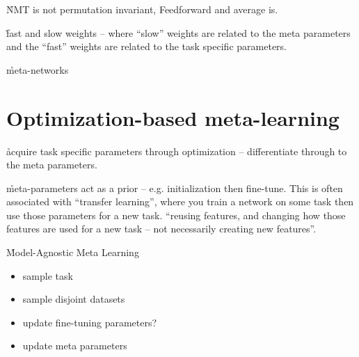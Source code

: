 \r{NMT is not permutation invariant, Feedforward and average is.\cite{garnelo2018conditional}}

\r{fast and slow weights -- where ``slow'' weights are related to the meta parameters and the ``fast'' weights are related to the task specific parameters.}

\r{meta-networks \cite{munkhdalai2017meta}}

\section{Optimization-based meta-learning}

\r{acquire task specific parameters through optimization -- differentiate through to the meta parameters.}

\r{meta-parameters act as a prior -- e.g. initialization then fine-tune. This is often associated with ``transfer learning'', where you train a network on some task then use those parameters for a new task. ``reusing features, and changing how those features are used for a new task -- not necessarily creating new features''.}


\r{Model-Agnostic Meta Learning }



\begin{itemize}[noitemsep,topsep=0pt]
	\item sample task
	\item sample disjoint datasets
	\item update fine-tuning parameters?
	\item update meta parameters
\end{itemize}




